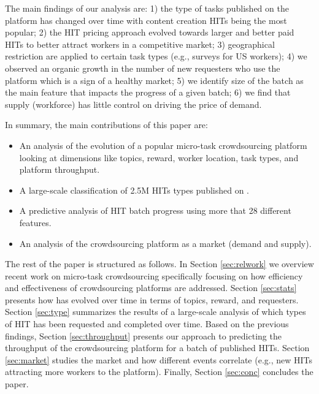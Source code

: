 The main findings of our analysis are: 1) the type of tasks published on the platform has changed over time with content creation HITs being the most popular; 2) the HIT pricing approach evolved towards larger and better paid HITs to better attract workers in a competitive market; 3) geographical restriction are applied to certain task types (e.g., surveys for US workers); 4) we observed an organic growth in the number of new requesters who use the platform which is a sign of a healthy market; 5) we identify size of the batch as the main feature that impacts the progress of a given batch; 6) we find that supply (workforce) has little control on driving the price of demand.

In summary, the main contributions of this paper are:
\begin{itemize}

	\item An analysis of the evolution of a popular micro-task crowdsourcing platform looking at dimensions like topics, reward, worker location, task types, and platform throughput.

	\item A large-scale classification of 2.5M HITs types published on \amt{}.

	\item A predictive analysis of HIT batch progress using more that 28 different features.
	
	\item An analysis of the crowdsourcing platform as a market (demand and supply).
	
\end{itemize}


The rest of the paper is structured as follows.
In Section \ref{sec:relwork} we overview recent work on micro-task crowdsourcing specifically focusing on how  efficiency and effectiveness  of crowdsourcing platforms are addressed.
Section \ref{sec:stats} presents how \amt{} has evolved over time in terms of topics, reward, and requesters.
Section \ref{sec:type} summarizes the results of a large-scale analysis of which types of HIT has been requested and completed over time.
Based on the previous findings, Section \ref{sec:throughput} presents our approach to predicting the throughput of the crowdsourcing platform for a batch of published HITs.
Section \ref{sec:market} studies the \amt{} market and how different events correlate (e.g., new HITs attracting more workers to the platform).
Finally, Section \ref{sec:conc} concludes the paper.

